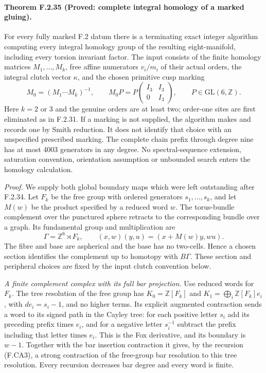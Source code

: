 \paragraph{Theorem F.2.35 (Proved: complete integral homology of a marked gluing).}
For every fully marked F.2 datum there is a terminating exact
integer algorithm computing every integral homology group of
the resulting eight-manifold, including every torsion invariant
factor.  The input consists of the finite homology matrices
$M_1,\ldots,M_k$, free affine numerators $v_i/m_i$ of their
actual orders, the integral clutch vector $\kappa$, and the
chosen primitive cusp marking
\[
 M_0=(M_1\cdots M_k)^{-1},\qquad
 M_0P=P\begin{pmatrix}I_3&I_3\\0&I_3\end{pmatrix},
 \qquad P\in\mathrm{GL}(6,\mathbb Z).                       \tag{F.GC1}
\]
Here $k=2$ or $3$ and the genuine orders are at least two;
order-one sites are first eliminated as in F.2.31.
If a marking is not supplied, the algorithm makes and records
one by Smith reduction.  It does not identify that choice
with an unspecified prescribed marking.
The complete chain prefix through degree nine has at most
4003 generators in any degree.  No spectral-sequence
extension, saturation convention, orientation assumption or
unbounded search enters the homology calculation.

\emph{Proof.}
We supply both global boundary maps which were left outstanding
after F.2.34.  Let $F_k$ be the free group with ordered
generators $s_1,\ldots,s_k$, and let $M(w)$ be the product
specified by a reduced word $w$.  The torus-bundle complement
over the punctured sphere retracts to the corresponding bundle
over a graph.  Its fundamental group and multiplication are
\[
 \Gamma=\mathbb Z^6\rtimes F_k,
 \qquad (x,w)(y,u)=(x+M(w)y,wu).                            \tag{F.GC2}
\]
The fibre and base are aspherical and the base has no
two-cells.  Hence a chosen section identifies the complement
up to homotopy with $B\Gamma$.  These section and peripheral
choices are fixed by the input clutch convention below.

\emph{A finite complement complex with its full bar projection.}
Use reduced words for $F_k$.  The tree resolution of the free
group has $K_0=\mathbb Z[F_k]$ and
$K_1=\bigoplus_i\mathbb Z[F_k]e_i$, with
$de_i=s_i-1$, and no higher terms.  Its explicit augmented
contraction sends a word to its signed path in the Cayley
tree: for each positive letter $s_i$ add its preceding prefix
times $e_i$, and for a negative letter $s_i^{-1}$ subtract
the prefix including that letter times $e_i$.
This is the Fox derivative, and its boundary is $w-1$.
Together with the bar insertion contraction it gives, by
the recursion (F.CA3), a strong contraction of the free-group
bar resolution to this tree resolution.  Every recursion
decreases bar degree and every word is finite.

